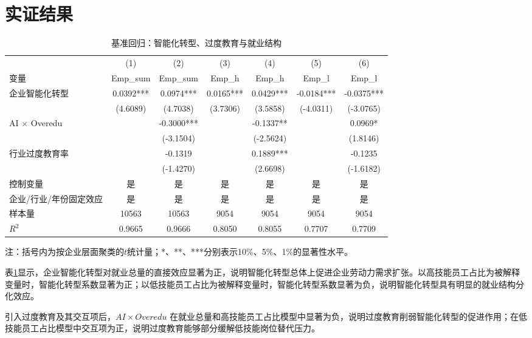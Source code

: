 \documentclass[UTF8,zihao=-4]{ctexart}
\begin{document}
\section{实证结果}
\begin{table}[H]\centering\caption{基准回归：智能化转型、过度教育与就业结构}\label{tab:core}
\scriptsize\begin{threeparttable}
\begin{tabular}{lcccccc}\toprule
 & (1) & (2) & (3) & (4) & (5) & (6) \\
变量 & Emp\_sum & Emp\_sum & Emp\_h & Emp\_h & Emp\_l & Emp\_l \\ \midrule
企业智能化转型 & 0.0392*** & 0.0974*** & 0.0165*** & 0.0429*** & -0.0184*** & -0.0375*** \\
 & (4.6089) & (4.7038) & (3.7306) & (3.5858) & (-4.0311) & (-3.0765) \\
AI $\times$ Overedu &  & -0.3000*** &  & -0.1337** &  & 0.0969* \\
 &  & (-3.1504) &  & (-2.5624) &  & (1.8146) \\
行业过度教育率 &  & -0.1319 &  & 0.1889*** &  & -0.1235 \\
 &  & (-1.4270) &  & (2.6698) &  & (-1.6182) \\
\midrule
控制变量 & 是 & 是 & 是 & 是 & 是 & 是 \\
企业/行业/年份固定效应 & 是 & 是 & 是 & 是 & 是 & 是 \\
样本量 & 10563 & 10563 & 9054 & 9054 & 9054 & 9054 \\
$R^2$ & 0.9665 & 0.9666 & 0.8050 & 0.8055 & 0.7707 & 0.7709 \\
\bottomrule\end{tabular}
\begin{tablenotes}\footnotesize \item 注：括号内为按企业层面聚类的$t$统计量；*、**、***分别表示10\%、5\%、1\%的显著性水平。\end{tablenotes}
\end{threeparttable}\end{table}

表\ref{tab:core}显示，企业智能化转型对就业总量的直接效应显著为正，说明智能化转型总体上促进企业劳动力需求扩张。以高技能员工占比为被解释变量时，智能化转型系数显著为正；以低技能员工占比为被解释变量时，智能化转型系数显著为负，说明智能化转型具有明显的就业结构分化效应。

引入过度教育及其交互项后，$AI\times Overedu$ 在就业总量和高技能员工占比模型中显著为负，说明过度教育削弱智能化转型的促进作用；在低技能员工占比模型中交互项为正，说明过度教育能够部分缓解低技能岗位替代压力。
\end{document}
